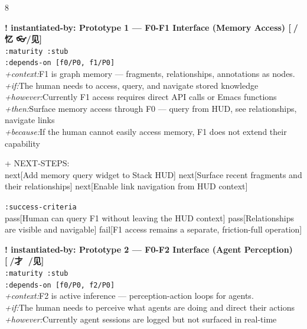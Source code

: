 \documentclass[landscape]{article}
\newcommand{\flexitag}[1]{\textcolor[gray]{0.35}{\textit{#1}}}
\newenvironment{devmapstub}{%
  \def\FrameCommand{\colorbox{devmapstubbg}}%
  \setlength{\fboxsep}{2pt}%
  \MakeFramed{\advance\hsize-\width \FrameRestore}%
}{\endMakeFramed}
\begin{document}
\begin{paracol}{8}
\begin{devmapstub}
\textbf{! instantiated-by: Prototype 1 — F0-F1 Interface (Memory Access) [📁/忆 👓/见]}\\
  \texttt{:\allowbreak{}maturity :\allowbreak{}stub}\\
  \texttt{:\allowbreak{}depends-\allowbreak{}on [f0/\allowbreak{}P0,\allowbreak{} f1/\allowbreak{}P0]}\\
  \flexitag{+context:}F1 is graph memory — fragments, relationships, annotations as nodes.\\
  \flexitag{+if:}The human needs to access, query, and navigate stored knowledge\\
  \flexitag{+however:}Currently F1 access requires direct API calls or Emacs functions\\
  \flexitag{+then:}Surface memory access through F0 — query from HUD, see relationships, navigate links\\
  \flexitag{+because:}If the human cannot easily access memory, F1 does not extend their capability\\
\par
  + NEXT-STEPS:\\
    next[Add memory query widget to Stack HUD] next[Surface recent fragments and their relationships] next[Enable link navigation from HUD context]\\
\par
  \texttt{:\allowbreak{}success-\allowbreak{}criteria}\\
    pass[Human can query F1 without leaving the HUD context] pass[Relationships are visible and navigable] fail[F1 access remains a separate, friction-full operation]\\
\par
\par
\end{devmapstub}
\begin{devmapstub}
\textbf{! instantiated-by: Prototype 2 — F0-F2 Interface (Agent Perception) [📎/才 👀/见]}\\
  \texttt{:\allowbreak{}maturity :\allowbreak{}stub}\\
  \texttt{:\allowbreak{}depends-\allowbreak{}on [f0/\allowbreak{}P0,\allowbreak{} f2/\allowbreak{}P0]}\\
  \flexitag{+context:}F2 is active inference — perception-action loops for agents.\\
  \flexitag{+if:}The human needs to perceive what agents are doing and direct their actions\\
  \flexitag{+however:}Currently agent sessions are logged but not surfaced in real-time\\

\end{devmapstub}
\end{paracol}
\end{document}
